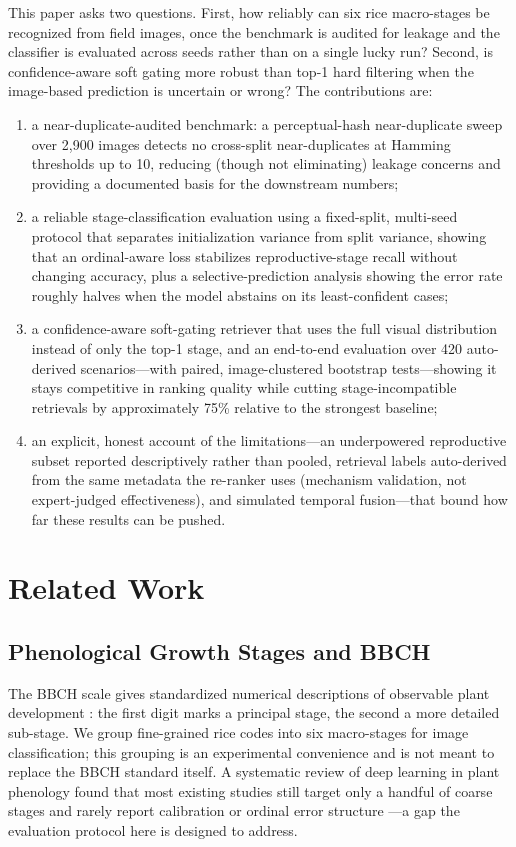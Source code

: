 \documentclass{llncs}
\begin{document}
This paper asks two questions. First, how reliably can six rice macro-stages be recognized from field images, once the benchmark is audited for leakage and the classifier is evaluated across seeds rather than on a single lucky run? Second, is confidence-aware soft gating more robust than top-1 hard filtering when the image-based prediction is uncertain or wrong? The contributions are:
\begin{enumerate}
    \item a near-duplicate-audited benchmark: a perceptual-hash near-duplicate sweep over 2{,}900 images detects no cross-split near-duplicates at Hamming thresholds up to 10, reducing (though not eliminating) leakage concerns and providing a documented basis for the downstream numbers;
    \item a reliable stage-classification evaluation using a fixed-split, multi-seed protocol that separates initialization variance from split variance, showing that an ordinal-aware loss stabilizes reproductive-stage recall without changing accuracy, plus a selective-prediction analysis showing the error rate roughly halves when the model abstains on its least-confident cases;
    \item a confidence-aware soft-gating retriever that uses the full visual distribution instead of only the top-1 stage, and an end-to-end evaluation over 420 auto-derived scenarios---with paired, image-clustered bootstrap tests---showing it stays competitive in ranking quality while cutting stage-incompatible retrievals by approximately 75\% relative to the strongest baseline;
    \item an explicit, honest account of the limitations---an underpowered reproductive subset reported descriptively rather than pooled, retrieval labels auto-derived from the same metadata the re-ranker uses (mechanism validation, not expert-judged effectiveness), and simulated temporal fusion---that bound how far these results can be pushed.
\end{enumerate}

\section{Related Work}

\subsection{Phenological Growth Stages and BBCH}

The BBCH scale gives standardized numerical descriptions of observable plant development \cite{meier2001bbch,lancashire1991uniform}: the first digit marks a principal stage, the second a more detailed sub-stage. We group fine-grained rice codes into six macro-stages for image classification; this grouping is an experimental convenience and is not meant to replace the BBCH standard itself. A systematic review of deep learning in plant phenology found that most existing studies still target only a handful of coarse stages and rarely report calibration or ordinal error structure \cite{katal2022deep}---a gap the evaluation protocol here is designed to address.
\end{document}
